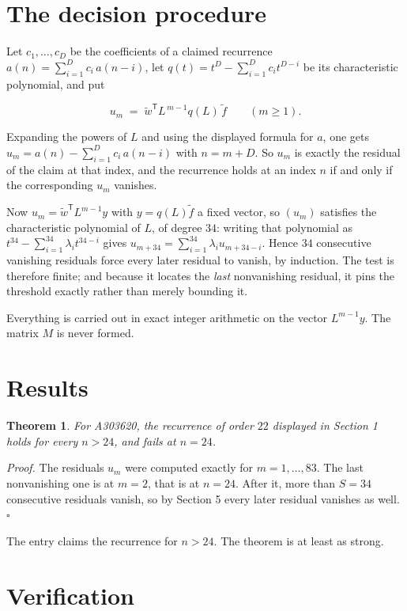\documentclass[11pt]{article}
\newtheorem{theorem}{Theorem}
\theoremstyle{definition}
\begin{document}
\section{The decision procedure}

Let $c_1,\dots,c_D$ be the coefficients of a claimed recurrence $a(n) = \sum_{i=1}^{D} c_i\,a(n-i)$, let $q(t) = t^{D} - \sum_{i=1}^{D} c_i t^{D-i}$ be its characteristic polynomial, and put

\[u_m \;=\; \tilde w^{\mathsf T} L^{\,m-1} q(L)\,\tilde f \qquad (m \ge 1).\]

Expanding the powers of $L$ and using the displayed formula for $a$, one gets $u_m = a(n) - \sum_{i=1}^{D} c_i\,a(n-i)$ with $n = m + D$. So $u_m$ is exactly the residual of the claim at that index, and the recurrence holds at an index $n$ if and only if the corresponding $u_m$ vanishes.

Now $u_m = \tilde w^{\mathsf T} L^{m-1} y$ with $y = q(L)\tilde f$ a fixed vector, so $(u_m)$ satisfies the characteristic polynomial of $L$, of degree $34$: writing that polynomial as $t^{34} - \sum_{i=1}^{34} \lambda_i t^{34-i}$ gives $u_{m+34} = \sum_{i=1}^{34} \lambda_i u_{m+34-i}$. Hence $34$ consecutive vanishing residuals force every later residual to vanish, by induction. The test is therefore finite; and because it locates the {\itshape last} nonvanishing residual, it pins the threshold exactly rather than merely bounding it.

Everything is carried out in exact integer arithmetic on the vector $L^{m-1}y$. The matrix $M$ is never formed.

\section{Results}

\begin{theorem} For A303620, the recurrence of order $22$ displayed in Section 1 holds for every $n > 24$, and fails at $n = 24$.\end{theorem}

{\itshape Proof.} The residuals $u_m$ were computed exactly for $m = 1,\dots,83$. The last nonvanishing one is at $m = 2$, that is at $n = 24$. After it, more than $S = 34$ consecutive residuals vanish, so by Section 5 every later residual vanishes as well. $\square$

The entry claims the recurrence for $n > 24$. The theorem is at least as strong.

\section{Verification}
\end{document}

